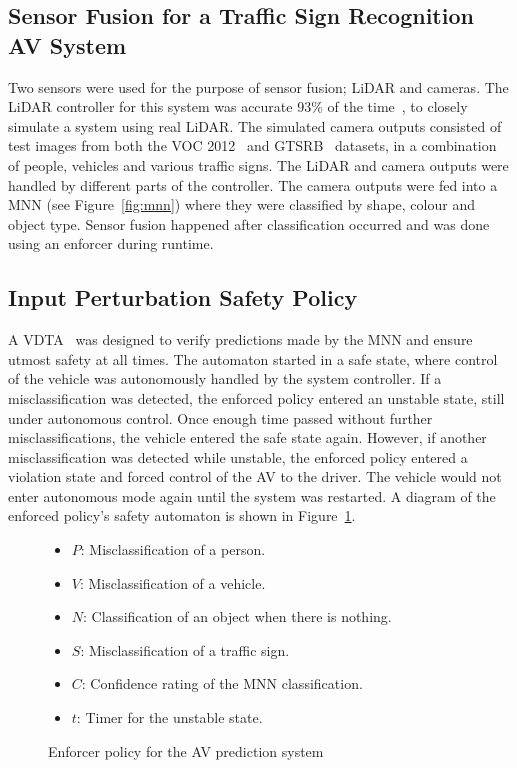 \subsection{Sensor Fusion for a Traffic Sign Recognition AV System}
Two sensors were used for the purpose of sensor fusion; \ac{LiDAR} and cameras.
The \ac{LiDAR} controller for this system was accurate 93\% of the time~\cite{lidarFusion}, to closely simulate a system using real \ac{LiDAR}.
The simulated camera outputs consisted of test images from both the \ac{VOC} 2012~\cite{pascal-voc-2012} and \ac{GTSRB}~\cite{Stallkamp2012-gtsrb} datasets, in a combination of people, vehicles and various traffic signs.
The \ac{LiDAR} and camera outputs were handled by different parts of the controller.
The camera outputs were fed into a \ac{MNN} (see Figure~\ref{fig:mnn}) where they were classified by shape, colour and object type.
Sensor fusion happened after classification occurred and was done using an enforcer during runtime.

\subsection{Input Perturbation Safety Policy}
A \acf{VDTA}~\cite{recps} was designed to verify predictions made by the \ac{MNN} and ensure utmost safety at all times.
The automaton started in a safe state, where control of the vehicle was autonomously handled by the system controller.
If a misclassification was detected, the enforced policy entered an unstable state, still under autonomous control. 
Once enough time passed without further misclassifications, the vehicle entered the safe state again.
However, if another misclassification was detected while unstable, the enforced policy entered a violation state and forced control of the \ac{AV} to the driver.
The vehicle would not enter autonomous mode again until the system was restarted.
A diagram of the enforced policy's safety automaton is shown in Figure~\ref{fig:signrte}.
\begin{figure}[h]
	\centering
	\scalebox{1.3}{}
	\begin{itemize}
		\item $P$: Misclassification of a person.
		\item $V$: Misclassification of a vehicle.
		\item $N$: Classification of an object when there is nothing.
		\item $S$: Misclassification of a traffic sign.
		\item $C$: Confidence rating of the \ac{MNN} classification.
		\item $t$: Timer for the unstable state.
	\end{itemize}
	
	\caption{Enforcer policy for the \acf{AV} prediction system}
	\label{fig:signrte}
\end{figure}

